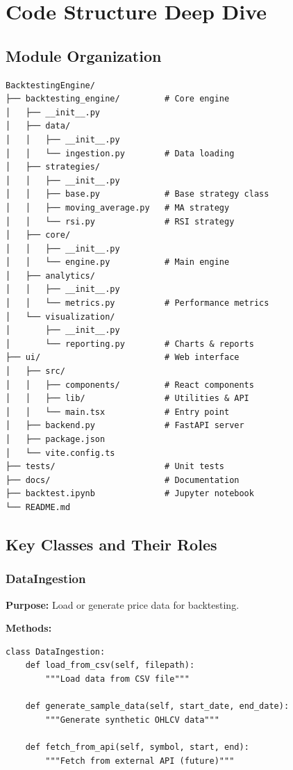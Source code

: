 \documentclass[11pt,a4paper]{article}
\begin{document}
\section{Code Structure Deep Dive}

\subsection{Module Organization}

\begin{verbatim}
BacktestingEngine/
├── backtesting_engine/         # Core engine
│   ├── __init__.py
│   ├── data/
│   │   ├── __init__.py
│   │   └── ingestion.py        # Data loading
│   ├── strategies/
│   │   ├── __init__.py
│   │   ├── base.py             # Base strategy class
│   │   ├── moving_average.py   # MA strategy
│   │   └── rsi.py              # RSI strategy
│   ├── core/
│   │   ├── __init__.py
│   │   └── engine.py           # Main engine
│   ├── analytics/
│   │   ├── __init__.py
│   │   └── metrics.py          # Performance metrics
│   └── visualization/
│       ├── __init__.py
│       └── reporting.py        # Charts & reports
├── ui/                         # Web interface
│   ├── src/
│   │   ├── components/         # React components
│   │   ├── lib/                # Utilities & API
│   │   └── main.tsx            # Entry point
│   ├── backend.py              # FastAPI server
│   ├── package.json
│   └── vite.config.ts
├── tests/                      # Unit tests
├── docs/                       # Documentation
├── backtest.ipynb              # Jupyter notebook
└── README.md
\end{verbatim}

\subsection{Key Classes and Their Roles}

\subsubsection{DataIngestion}

\textbf{Purpose:} Load or generate price data for backtesting.

\textbf{Methods:}
\begin{lstlisting}[style=pythoncode]
class DataIngestion:
    def load_from_csv(self, filepath):
        """Load data from CSV file"""
        
    def generate_sample_data(self, start_date, end_date):
        """Generate synthetic OHLCV data"""
        
    def fetch_from_api(self, symbol, start, end):
        """Fetch from external API (future)"""
\end{lstlisting}
\end{document}
